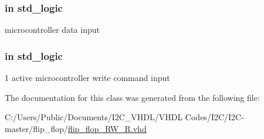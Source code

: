 \subsubsection[{\texorpdfstring{uc\+\_\+data\+\_\+in}{uc_data_in}}]{ {\bfseries \textcolor{vhdlchar}{in}\textcolor{vhdlchar}{ }} {\bfseries \textcolor{vhdlchar}{std\+\_\+logic}\textcolor{vhdlchar}{ }} \hspace{0.3cm}{\ttfamily [Port]}}\hypertarget{classflip__flop___r_w___r_aeb86d5268b7f0b59c74427f44096ffd5}{}\label{classflip__flop___r_w___r_aeb86d5268b7f0b59c74427f44096ffd5}


microcontroller data input 

\subsubsection[{\texorpdfstring{uc\+\_\+write\+\_\+command}{uc_write_command}}]{ {\bfseries \textcolor{vhdlchar}{in}\textcolor{vhdlchar}{ }} {\bfseries \textcolor{vhdlchar}{std\+\_\+logic}\textcolor{vhdlchar}{ }} \hspace{0.3cm}{\ttfamily [Port]}}\hypertarget{classflip__flop___r_w___r_adec7180b72b510c9b6576424bd7fde7e}{}\label{classflip__flop___r_w___r_adec7180b72b510c9b6576424bd7fde7e}


\textquotesingle{}1\textquotesingle{} active microcontroller write command input 



The documentation for this class was generated from the following file\+:\begin{DoxyCompactItemize}
\item 
C\+:/\+Users/\+Public/\+Documents/\+I2\+C\+\_\+\+V\+H\+D\+L/\+V\+H\+D\+L Codes/\+I2\+C/\+I2\+C-\/master/flip\+\_\+flop/\hyperlink{flip__flop___r_w___r_8vhd}{flip\+\_\+flop\+\_\+\+R\+W\+\_\+\+R.\+vhd}\end{DoxyCompactItemize}
